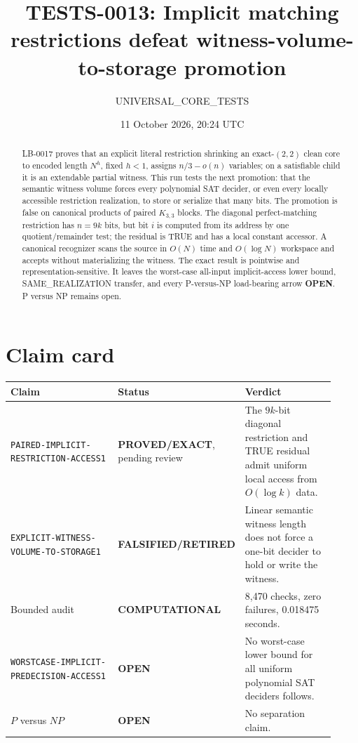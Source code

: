 \documentclass[11pt]{article}
\title{TESTS-0013: Implicit matching restrictions defeat witness-volume-to-storage promotion}
\author{UNIVERSAL\_CORE\_TESTS}
\date{11 October 2026, 20:24 UTC}
\newcommand{\EXACT}{\textbf{PROVED/EXACT}}
\newcommand{\COMP}{\textbf{COMPUTATIONAL}}
\newcommand{\OPEN}{\textbf{OPEN}}
\newcommand{\RETIRED}{\textbf{FALSIFIED/RETIRED}}
\begin{document}
\maketitle

\begin{abstract}
LB-0017 proves that an explicit literal restriction shrinking an exact-$(2,2)$
clean core to encoded length $N^h$, fixed $h<1$, assigns
$n/3-o(n)$ variables; on a satisfiable child it is an extendable partial
witness.  This run tests the next promotion: that the semantic witness volume
forces every polynomial SAT decider, or even every locally accessible
restriction realization, to store or serialize that many bits.  The promotion
is false on canonical products of paired $K_{3,3}$ blocks.  The diagonal
perfect-matching restriction has $n=9k$ bits, but bit $i$ is computed from its
address by one quotient/remainder test; the residual is TRUE and has a local
constant accessor.  A canonical recognizer scans the source in $O(N)$ time
and $O(\log N)$ workspace and accepts without materializing the witness.
The exact result is pointwise and representation-sensitive.  It leaves the
worst-case all-input implicit-access lower bound, SAME\_REALIZATION transfer,
and every P-versus-NP load-bearing arrow \OPEN.  P versus NP remains open.
\end{abstract}

\section{Claim card}
\begin{center}\small
\begin{tabular}{p{0.39\linewidth}p{0.20\linewidth}p{0.33\linewidth}}
\toprule
Claim & Status & Verdict\\
\midrule
\texttt{PAIRED-IMPLICIT-RESTRICTION-ACCESS1} & \EXACT, pending review &
The $9k$-bit diagonal restriction and TRUE residual admit uniform local
access from $O(\log k)$ data.\\
\texttt{EXPLICIT-WITNESS-VOLUME-TO-STORAGE1} & \RETIRED &
Linear semantic witness length does not force a one-bit decider to hold or
write the witness.\\
Bounded audit & \COMP & 8,470 checks, zero failures, 0.018475 seconds.\\
\texttt{WORSTCASE-IMPLICIT-PREDECISION-ACCESS1} & \OPEN &
No worst-case lower bound for all uniform polynomial SAT deciders follows.\\
$P$ versus $NP$ & \OPEN & No separation claim.\\
\bottomrule
\end{tabular}
\end{center}
\end{document}
